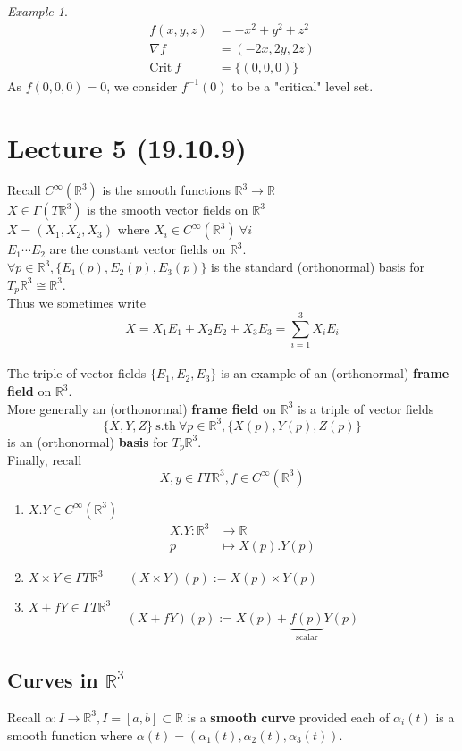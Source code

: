 \documentclass{article}
\let\ddd\cdots
\newcommand{\sth}{\ \mathrm{s.th\ }}
\newcommand{\R}{\mathbb{R}}
\newcommand{\crit}{\mathrm{Crit}\ }
\theoremstyle{definition}
\theoremstyle{remark}
\theoremstyle{example}
\newtheorem*{example}{Example}
\begin{document}
	\begin{example}
		\begin{align*}
			f(x,y,z) & = -x^2+y^2+z^2\\
			\nabla f & = (-2x,2y,2z)\\
			\crit f & = \{(0,0,0)\}
		\end{align*}
		As $f(0,0,0)=0$, we consider $f^{-1}(0)$ to be a "critical" level set.
	\end{example}
	
	\pagebreak

	\section*{Lecture 5 (19.10.9)}
	Recall $C^\infty(\R^3)$ is the smooth functions $\R^3 \to \R$\\
	$X \in \Gamma (T \R^3)$ is the smooth vector fields on $\R^3$\\
	$X=(X_1,X_2,X_3)$ where $X_i \in C^\infty(\R^3) \ \forall i$\\
	$E_1 \ddd E_2 $ are the constant vector fields on $\R^3$.\\
	$\forall p \in \R^3, \{E_1(p),E_2(p),E_3(p)\}$ is the standard (orthonormal) basis for $T_p\R^3 \cong \R^3$.\\
	Thus we sometimes write \[X=X_1E_1+X_2E_2+X_3E_3 = \sum_{i=1}^{3}X_iE_i \]\\
	The triple of vector fields $\{E_1,E_2,E_3\}$ is an example of an (orthonormal) \textbf{frame field} on $\R^3$.\\
	More generally an (orthonormal) \textbf{frame field} on $\R^3$ is a triple of vector fields \[\{X,Y,Z\} \sth \forall p \in \R^3, \{X(p),Y(p),Z(p)\}\] is an (orthonormal) \textbf{basis} for $T_p\R^3$.\\
	Finally, recall \[X,y \in \Gamma T \R^3, f \in C^\infty (\R^3) \]
	\begin{enumerate}
		\item $X.Y \in C^\infty (\R^3)$
		\begin{align*}
			X.Y:\R^3 & \to \R\\
			p & \mapsto X(p).Y(p)
		\end{align*}
		\item $X \times Y \in \Gamma T \R^3 \qquad (X \times Y)(p) := X(p) \times Y(p)$
		\item $X + fY \in \Gamma T \R^3$
		\[ (X+fY)(p) := X(p) + \underbrace{f(p)}_\mathrm{scalar} Y(p) \]
	\end{enumerate}

	\subsection{Curves in $\R^3$}
	Recall $\alpha:I \to \R^3, I=[a,b] \subset \R$ is a \textbf{smooth curve} provided each of $\alpha_i(t)$ is a smooth function where $\alpha(t)=(\alpha_1(t),\alpha_2(t), \alpha_3(t))$.
	
\end{document}
